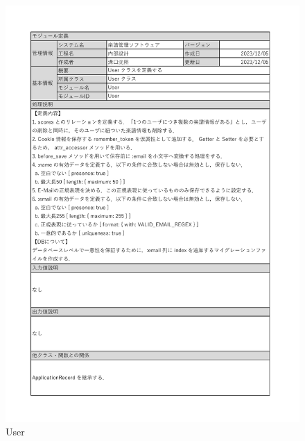 \begin{figure}
    \centering
    \includegraphics[scale=0.5]{img/Model/User.pdf}
    \caption{User}
\end{figure}